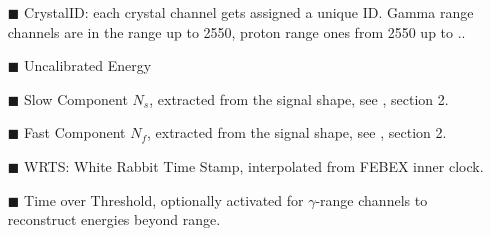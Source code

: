\begin{itemize}
\item[$\blacksquare$] CrystalID: each crystal channel gets assigned a unique ID. Gamma range channels are in the range up to 2550, proton range ones from 2550 up to ..
\item[$\blacksquare$] Uncalibrated Energy
\item[$\blacksquare$] Slow Component $N_s$, extracted from the signal shape, see \cite{winkel2011implementierung}, section 2.
\item[$\blacksquare$] Fast Component $N_f$, extracted from the signal shape, see \cite{winkel2011implementierung}, section 2.
\item[$\blacksquare$] WRTS: White Rabbit Time Stamp\cite{serrano2013white}, interpolated from FEBEX inner clock.
\item[$\blacksquare$] Time over Threshold, optionally activated for $\gamma$-range channels to reconstruct energies beyond range.
\end{itemize}

